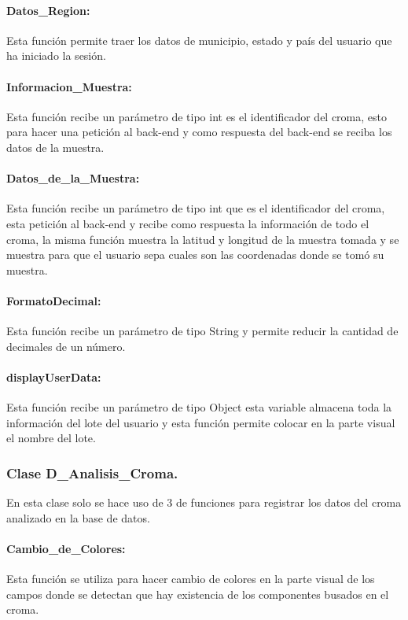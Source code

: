 \paragraph {Datos\_Region:} Esta función permite traer los datos de municipio, estado y país del usuario que ha iniciado la sesión.
    
\paragraph {Informacion\_Muestra:} Esta función recibe un parámetro de tipo int es el identificador del croma, esto para hacer una petición 
al back-end y como respuesta del back-end se reciba los datos de la muestra.
    
\paragraph {Datos\_de\_la\_Muestra:} Esta función recibe un parámetro de tipo int que es el identificador del croma, esta petición al back-end 
y recibe como respuesta la información de todo el croma, la misma función muestra la latitud y longitud de la muestra tomada y se muestra 
para que el usuario sepa cuales son las coordenadas donde se tomó su muestra.
    
\paragraph {FormatoDecimal:} Esta función recibe un parámetro de tipo String y permite reducir la cantidad de decimales de un número.
    
\paragraph {displayUserData:} Esta función recibe un parámetro de tipo Object esta variable almacena toda la información del lote del 
usuario y esta función permite colocar en la parte visual el nombre del lote.

\subsubsection{Clase D\_Analisis\_Croma.}
En esta clase solo se hace uso de 3 de funciones para registrar los datos del croma analizado en la base de datos.

\paragraph {Cambio\_de\_Colores:} Esta función se utiliza para hacer cambio de colores en la parte visual de los campos donde se detectan 
que hay existencia de los componentes busados en el croma.
    
